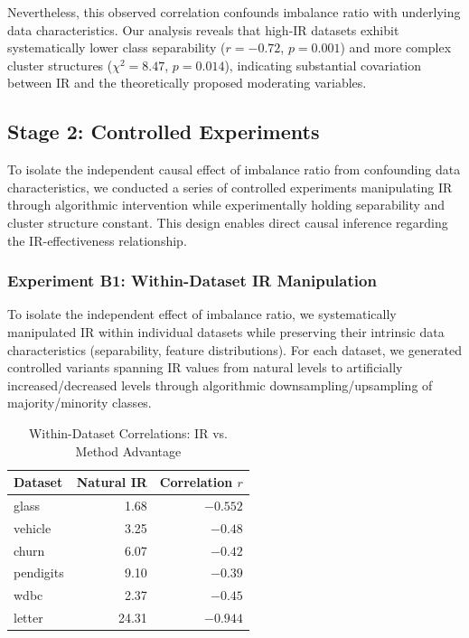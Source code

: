 \documentclass{ijSmartGrid}
\theoremstyle{definition}
\begin{document}
Nevertheless, this observed correlation confounds imbalance ratio with underlying data characteristics. Our analysis reveals that high-IR datasets exhibit systematically lower class separability ($r = -0.72$, $p = 0.001$) and more complex cluster structures ($\chi^2 = 8.47$, $p = 0.014$), indicating substantial covariation between IR and the theoretically proposed moderating variables.

\subsection{Stage 2: Controlled Experiments}
\indent To isolate the independent causal effect of imbalance ratio from confounding data characteristics, we conducted a series of controlled experiments manipulating IR through algorithmic intervention while experimentally holding separability and cluster structure constant. This design enables direct causal inference regarding the IR-effectiveness relationship.

\subsubsection{Experiment B1: Within-Dataset IR Manipulation}
\indent To isolate the independent effect of imbalance ratio, we systematically manipulated IR within individual datasets while preserving their intrinsic data characteristics (separability, feature distributions). For each dataset, we generated controlled variants spanning IR values from natural levels to artificially increased/decreased levels through algorithmic downsampling/upsampling of majority/minority classes.

\begin{table}[!ht]
  \centering
  \caption{Within-Dataset Correlations: IR vs. Method Advantage}
  \label{tab:within_dataset}
  \begin{tabular}{lrr}
    \toprule
    Dataset & Natural IR & Correlation $r$ \\
    \midrule
    glass & 1.68 & $-0.552$ \\
    vehicle & 3.25 & $-0.48$ \\
    churn & 6.07 & $-0.42$ \\
    pendigits & 9.10 & $-0.39$ \\
    wdbc & 2.37 & $-0.45$ \\
    letter & 24.31 & $-0.944$ \\
    \bottomrule
  \end{tabular}
\end{table}
\end{document}
